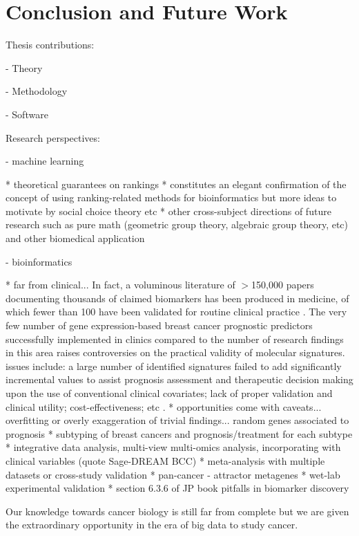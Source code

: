 \chapter{Conclusion and Future Work}
\label{chap:conclusion}

Thesis contributions:

- Theory

- Methodology

- Software

Research perspectives:

- machine learning

* theoretical guarantees on rankings
* constitutes an elegant confirmation of the concept of using ranking-related methods for bioinformatics but more ideas to motivate by social choice theory etc
* other cross-subject directions of future research such as pure math (geometric group theory, algebraic group theory, etc) and other biomedical application

- bioinformatics

* far from clinical... In fact, a voluminous literature of $>$150,000 papers documenting thousands of claimed biomarkers has been produced in medicine, of which fewer than 100 have been validated for routine clinical practice \cite{Poste2011Bring}. The very few number of gene expression-based breast cancer prognostic predictors successfully implemented in clinics compared to the number of research findings in this area raises controversies on the practical validity of molecular signatures. issues include: a large number of identified signatures failed to add significantly incremental values to assist prognosis assessment and therapeutic decision making upon the use of conventional clinical covariates; lack of proper validation and clinical utility; cost-effectiveness; etc \cite{Michiels2016Statistical}.
* opportunities come with caveats... overfitting or overly exaggeration of trivial findings... random genes associated to prognosis \cite{Venet2011Most}
* subtyping of breast cancers and prognosis/treatment for each subtype
* integrative data analysis, multi-view multi-omics analysis, incorporating with clinical variables (quote Sage-DREAM BCC)
* meta-analysis with multiple datasets or cross-study validation
* pan-cancer - attractor metagenes
* wet-lab experimental validation
* section 6.3.6 of JP book pitfalls in biomarker discovery

Our knowledge towards cancer biology is still far from complete but we are given the extraordinary opportunity in the era of big data to study cancer.

